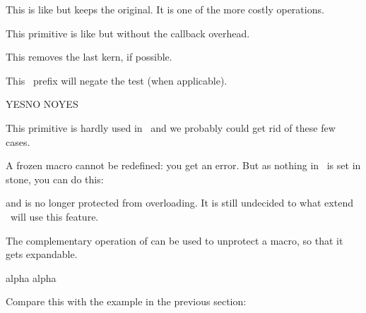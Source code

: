 \stopoldprimitive

\startoldprimitive[title={\prm {unhcopy}}]

This is like  but keeps the original. It is one of the more costly
operations.

\stopoldprimitive

\startnewprimitive[title={\prm {unhpack}}]

This primitive is like  but without the callback overhead.

\stopnewprimitive

\startoldprimitive[title={\prm {unkern}}]

This removes the last kern, if possible.

\stopoldprimitive

\startoldprimitive[title={\prm {unless}}]

This \ETEX\ prefix will negate the test (when applicable).

\starttyping
       \ifx\one\two YES\else NO\fi
\unless\ifx\one\two NO\else YES\fi
\stoptyping

This primitive is hardly used in \CONTEXT\ and we probably could get rid of these
few cases.

\stopoldprimitive

\startnewprimitive[title={\prm {unletfrozen}}]

A frozen macro cannot be redefined: you get an error. But as nothing in \TEX\ is set
in stone, you can do this:

\starttyping
\frozen{}
\unletfrozen\MyMacro
\stoptyping

and \type {\MyMacro} is no longer protected from overloading. It is still
undecided to what extend \CONTEXT\ will use this feature.

\stopnewprimitive

\startnewprimitive[title={\prm {unletprotected}}]

The complementary operation of  can be used to unprotect
a macro, so that it gets expandable.

\startbuffer
               \def  \MyMacroA{alpha}
\protected     {}
               \edef \MyMacroC{\MyMacroA\MyMacroB}
\unletprotected      \MyMacroB
               \edef \MyMacroD{\MyMacroA\MyMacroB}
\meaning             \MyMacroC\crlf
\meaning             \MyMacroD\par
\stopbuffer

\typebuffer

Compare this with the example in the previous section:


